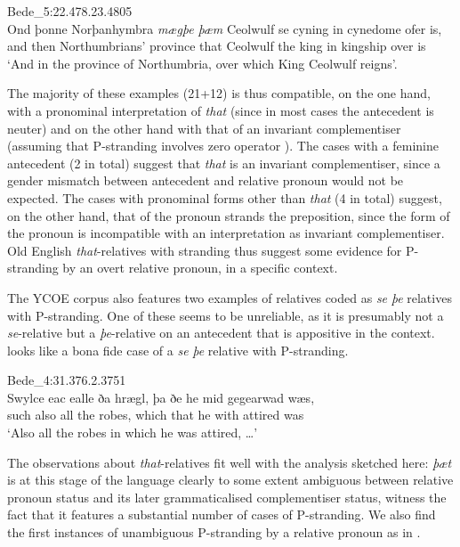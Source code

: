 \documentclass[output=paper]{langsci/langscibook}
\begin{document}
\ea Bede\_5:22.478.23.4805%
    \label{ex:key:11.11}\\
    \gll Ond þonne Norþanhymbra   \textit{mægþe}   \textit{þæm} Ceolwulf se    cyning in cynedome ofer is,   \\
        and then    Northumbrians’ province that   Ceolwulf  the king  in    kingship over is\\
    \glt ‘And in the province of Northumbria, over which King Ceolwulf reigns’.
\z

The majority of these examples (21+12) is thus compatible, on the one hand,
with a pronominal interpretation of \textit{that} (since in most cases the
antecedent is neuter) and on the other hand with that of an invariant
complementiser (assuming that P-stranding involves
zero operator ).  The cases with a feminine antecedent (2 in total)
suggest that \textit{that} is an invariant complementiser, since a gender
mismatch between antecedent and relative pronoun would not be expected. The
cases with pronominal forms other than \textit{that} (4 in total) suggest, on
the other hand, that  of the pronoun strands the preposition, since the
form of the pronoun is incompatible with an interpretation as invariant
complementiser. Old English \textit{that}-relatives with stranding thus suggest
some evidence for P-stranding by an overt relative pronoun, in a specific
context.

The YCOE corpus also features two examples of relatives coded as \textit{se} \textit{þe} relatives with P-stranding. One of these seems to be unreliable, as it is presumably not a \textit{se}-relative but a \textit{þe}-relative on an antecedent that is appositive in the context.  looks like a bona fide case of a \textit{se} \textit{þe} relative with P-stranding.

\ea Bede\_4:31.376.2.3751%
    \label{ex:key:11.13}\\
    \gll Swylce eac ealle ða  hrægl, þa       ðe   he mid gegearwad wæs, \\
        such    also all    the robes, which that he with attired was \\
    \glt ‘Also all the robes in which he was attired, …’
\z

The observations about \emph{that}-relatives fit well with the analysis
sketched here: \textit{þæt} is at this stage of the language clearly to some
extent ambiguous between relative pronoun status and its later grammaticalised
complementiser status, witness the fact that it features a substantial number
of cases of P-stranding. We also find the first
instances of unambiguous P-stranding by a relative pronoun as in
.
\end{document}
